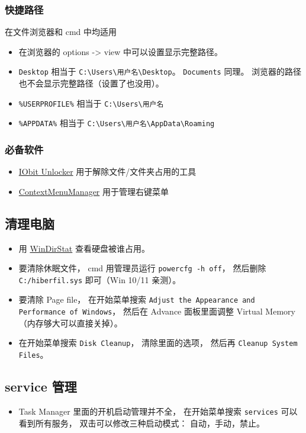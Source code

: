 \subsubsection{快捷路径}
在文件浏览器和 cmd 中均适用
\begin{itemize}
\item 在浏览器的 options -> view 中可以设置显示完整路径。
\item \verb|Desktop| 相当于 \verb|C:\Users\用户名\Desktop|。 \verb|Documents| 同理。 浏览器的路径也不会显示完整路径（设置了也没用）。
\item \verb|%USERPROFILE%| 相当于 \verb|C:\Users\用户名|
\item \verb|%APPDATA%| 相当于 \verb|C:\Users\用户名\AppData\Roaming|
\end{itemize}

\subsubsection{必备软件}
\begin{itemize}
\item \href{https://www.iobit.com/en/iobit-unlocker.php}{IObit Unlocker} 用于解除文件/文件夹占用的工具
\item \href{https://github.com/BluePointLilac/ContextMenuManager}{ContextMenuManager} 用于管理右键菜单
\end{itemize}

\subsection{清理电脑}
\begin{itemize}
\item 用 \href{https://windirstat.net/}{WinDirStat} 查看硬盘被谁占用。
\item 要清除休眠文件， cmd 用管理员运行 \verb|powercfg -h off|， 然后删除 \verb|C:/hiberfil.sys| 即可（Win 10/11 亲测）。
\item 要清除 Page file， 在开始菜单搜索 \verb|Adjust the Appearance and Performance of Windows|， 然后在 Advance 面板里面调整 Virtual Memory（内存够大可以直接关掉）。
\item 在开始菜单搜索 \verb|Disk Cleanup|， 清除里面的选项， 然后再 \verb|Cleanup System Files|。
\end{itemize}

\subsection{service 管理}
\begin{itemize}
\item Task Manager 里面的开机启动管理并不全， 在开始菜单搜索 \verb`services` 可以看到所有服务， 双击可以修改三种启动模式： 自动，手动，禁止。
\end{itemize}

